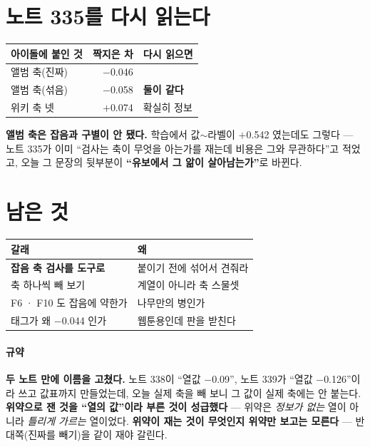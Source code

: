 \documentclass[10pt]{article}
\begin{document}
\section{노트 335를 다시 읽는다}

\begin{center}\footnotesize
\begin{tabular}{lrl}
\hline
아이돌에 붙인 것 & 짝지은 차 & 다시 읽으면 \\
\hline
앨범 축(진짜) & $-$0.046 & \\
앨범 축(섞음) & $-$0.058 & \textbf{둘이 같다} \\
위키 축 넷 & $+$0.074 & 확실히 정보 \\
\hline
\end{tabular}
\end{center}

\textbf{앨범 축은 잡음과 구별이 안 됐다.} 학습에서 값$\sim$라벨이
$+$0.542 였는데도 그렇다 --- 노트 335가 이미 ``검사는 축이 무엇을 아는가를
재는데 비용은 그와 무관하다''고 적었고, 오늘 그 문장의 뒷부분이
\textbf{``유보에서 그 앎이 살아남는가''}로 바뀐다.

\section{남은 것}
\begin{center}\footnotesize
\begin{tabular}{ll}
\hline
갈래 & 왜 \\
\hline
\textbf{잡음 축 검사를 도구로} & 붙이기 전에 섞어서 견줘라 \\
축 하나씩 빼 보기 & 계열이 아니라 축 스물셋 \\
F6 · F10 도 잡음에 약한가 & 나무만의 병인가 \\
태그가 왜 $-$0.044 인가 & 웹툰용인데 판을 받친다 \\
\hline
\end{tabular}
\end{center}

\paragraph{규약} \textbf{두 노트 만에 이름을 고쳤다.} 노트 338이 ``열값
$-$0.09'', 노트 339가 ``열값 $-$0.126''이라 쓰고 값표까지 만들었는데,
오늘 실제 축을 빼 보니 그 값이 실제 축에는 안 붙는다. \textbf{위약으로
잰 것을 ``열의 값''이라 부른 것이 성급했다} --- 위약은 \emph{정보가 없는}
열이 아니라 \emph{틀리게 가르는} 열이었다. \textbf{위약이 재는 것이
무엇인지 위약만 보고는 모른다} --- 반대쪽(진짜를 빼기)을 같이 재야 갈린다.
\end{document}
